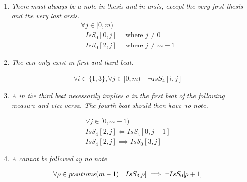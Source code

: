 \begin{enumerate}[wide, label=\bfseries 5.R\arabic*]
    \item  \label{rhythm:taexist} \textit{There must always be a note in thesis and in arsis, except the very first thesis and the very last arsis.}
       \begin{equation}
        \begin{gathered}
            \forall j \in [0, m)\\
            \lnot IsS_{0}[0, j]\quad \text{ where } j \neq 0\\
            \lnot IsS_{0}[2, j]\quad \text{ where } j \neq m-1
        \end{gathered}
    \end{equation}

    \item \label{rhythm:no4in2and4} \textit{The  can only exist in first and third beat.}
    
    \begin{equation}
        \begin{gathered}
            \forall i \in \{1, 3\}, \forall j \in [0, m)\quad
            \lnot IsS_{4}[i, j]
        \end{gathered}
    \end{equation}

    \item \label{rhythm:404} \textit{A  in the third beat necessarily implies a  in the first beat of the following measure and vice versa. The fourth beat should then have no note.}
    
    \begin{equation}
        \begin{gathered}
            \forall j \in [0, m-1)\\
            IsS_{4}[2, j] \iff IsS_{4}[0, j+1]\\
            IsS_{4}[2, j] \implies IsS_{0}[3, j]
        \end{gathered}
    \end{equation}

    \item \label{rhythm:no0after3} \textit{A  cannot be followed by no note.}
    
    \begin{equation}
        \begin{gathered}
            \forall \rho \in positions(m-1)\quad
            IsS_{3}[\rho] \implies \lnot IsS_{0}[\rho+1]
        \end{gathered}
    \end{equation}


\end{enumerate}
